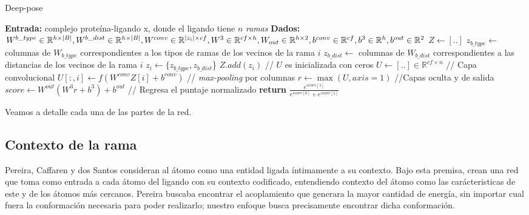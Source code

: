 \begin{algorithm}[H]
  \caption{Deep-pose}
  \begin{algorithmic}[1]
    \State \textbf{Entrada:} complejo proteína-ligando x,
    donde el ligando tiene $n$ \textit{ramas}
    \State \textbf{Dados:}\newline
                           $W^{b\_type} \in \mathbb{R}^{h\times |B|}, W^{b\_dist}
                           \in \mathbb{R}^{h\times |B|},\newline
                           W^{conv} \in \mathbb{R}^{|z_i| \times cf}, W^3 \in
                           \mathbb{R}^{cf \times h},\newline
                           W_{out} \in \mathbb{R}^{h \times 2},\newline
                           b^{conv} \in \mathbb{R}^{cf}, b^{3} \in
                           \mathbb{R}^{h},\newline
                           b^{out} \in \mathbb{R}^{2}$
    \State $Z \gets [..]$
      \State $z_{b\_type} \gets$ columnas de $W_{b\_type}$
      correspondientes a los tipos de ramas de los vecinos de la
      rama $i$
      \State $z_{b\_dist} \gets$  columnas de $W_{b\_dist}$
      correspondientes a las distancias de los vecinos de la rama $i$
      \State $z_i \gets \{z_{b\_type}, z_{b\_dist}$\}
      \State $Z.add(z_i)$
    \EndFor
    \State // $U$ es inicializada con ceros
    \State $U \gets [..] \in \mathbb{R}^{cf \times n}$
    \State // Capa convolucional
      \State $U[:,i]\gets f(W^{conv}Z[i] + b^{conv})$
    \EndFor
    \State // \textit{max-pooling} por columnas
    \State $r\gets \max(U, axis=1)$
    \State //Capas oculta y de salida
    \State $score\gets W^{out}(W^3r + b^3) + b^{out}$
    \State // Regresa el puntaje normalizado
    \State \textbf{return} $\frac{e^{score[1]}}{e^{score[0]}+e^{score[1]}}$
  \end{algorithmic}
\end{algorithm}
Veamos a detalle cada una de las partes de la red.

\subsection{Contexto de la rama}
Pereira, Caffaren y dos Santos \cite{dossantos} consideran al átomo
como una entidad ligada íntimamente a su contexto. Bajo esta premisa,
crean una red que toma como entrada a cada átomo del ligando con su
contexto codificado, entendiendo contexto del átomo como las
carácteristicas de este y de los átomos más cercanos.
Pereira buscaba encontrar el acoplamiento que generara la mayor
cantidad de energía, sin importar cual fuera la conformación necesaria
para poder realizarlo; nuestro enfoque busca precisamente encontrar
dicha conformación.

